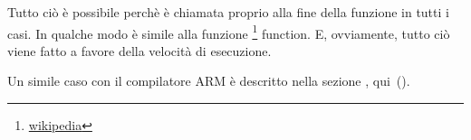 \newcommand{\URLSJ}{\href{http://go.yurichev.com/17121}{wikipedia}}

Tutto ciò è possibile perchè \printf è chiamata proprio alla fine della funzione \ttf in tutti i casi.
In qualche modo è simile alla funzione \footnote{\URLSJ} function.
E, ovviamente, tutto ciò viene fatto a favore della velocità di esecuzione.

Un simile caso con il compilatore ARM è descritto nella sezione \q{\PrintfSeveralArgumentsSectionName}, qui~().



